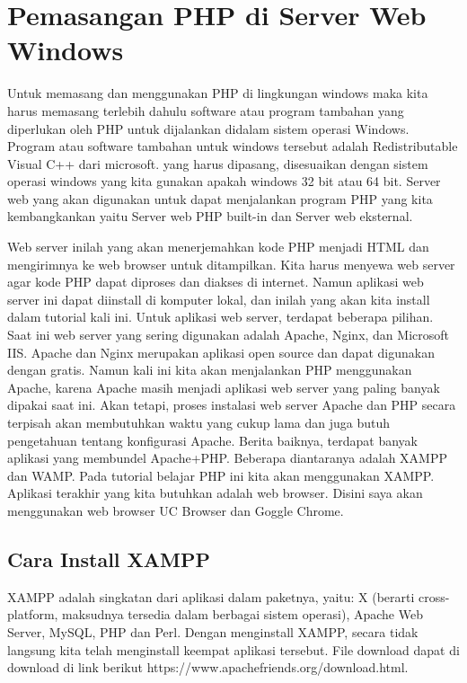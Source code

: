 \section{Pemasangan PHP di Server Web Windows}
Untuk memasang dan menggunakan PHP di lingkungan windows maka kita harus memasang terlebih dahulu software atau program tambahan yang diperlukan oleh PHP untuk dijalankan didalam sistem operasi Windows. Program atau software tambahan untuk windows tersebut adalah Redistributable Visual C++ dari microsoft. yang harus dipasang, disesuaikan dengan sistem operasi windows yang kita gunakan apakah windows 32 bit atau 64 bit. Server web yang akan digunakan untuk dapat menjalankan program PHP yang kita kembangkankan yaitu Server web PHP built-in dan Server web eksternal. 
\par
Web server inilah yang akan menerjemahkan kode PHP menjadi HTML dan mengirimnya ke web browser untuk ditampilkan. Kita harus menyewa web server agar kode PHP dapat diproses dan diakses di internet. Namun aplikasi web server ini dapat diinstall di komputer lokal, dan inilah yang akan kita install dalam tutorial kali ini. Untuk aplikasi web server, terdapat beberapa pilihan. Saat ini web server yang sering digunakan adalah Apache, Nginx, dan Microsoft IIS. Apache dan Nginx merupakan aplikasi open source dan dapat digunakan dengan gratis. Namun kali ini kita akan menjalankan PHP menggunakan Apache, karena Apache masih menjadi aplikasi web server yang paling banyak dipakai saat ini. Akan tetapi, proses instalasi web server Apache dan PHP secara terpisah akan membutuhkan waktu yang cukup lama dan juga butuh pengetahuan tentang konfigurasi Apache. Berita baiknya, terdapat banyak aplikasi yang membundel Apache+PHP. Beberapa diantaranya adalah XAMPP dan WAMP. Pada tutorial belajar PHP ini kita akan menggunakan XAMPP. Aplikasi terakhir yang kita butuhkan adalah web browser. Disini saya akan menggunakan web browser UC Browser dan Goggle Chrome.

\subsection{Cara Install XAMPP}
XAMPP adalah singkatan dari aplikasi dalam paketnya, yaitu: X (berarti cross-platform, maksudnya tersedia dalam berbagai sistem operasi), Apache Web Server, MySQL, PHP dan Perl. Dengan menginstall XAMPP, secara tidak langsung kita telah menginstall keempat aplikasi tersebut. File download dapat di download di link berikut https://www.apachefriends.org/download.html.

